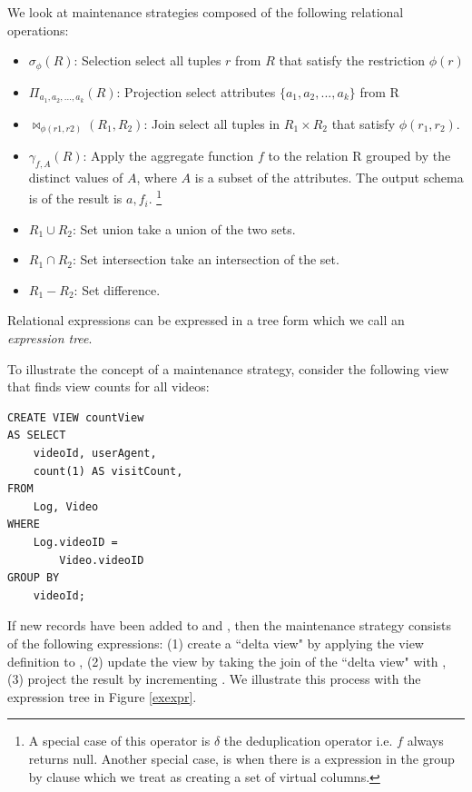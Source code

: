 We look at maintenance strategies composed of the following relational operations:
\begin{itemize}\vspace{-.45em}
\item $\sigma_{\phi}(R)$: Selection select all tuples $r$ from $R$ that satisfy the restriction $\phi (r)$ \vspace{-.45em}
\item $\Pi_{a_1,a_2,...,a_k}(R)$: Projection select attributes $\{a_1,a_2,...,a_k\}$ from R \vspace{-.45em}
\item $\bowtie_{\phi (r1,r2)}(R_1,R_2)$: Join select all tuples in $R_1 \times R_2$ that satisfy $\phi (r_1,r_2)$.
\item $\gamma_{f,A}(R)$: Apply the aggregate function $f$ to the relation R grouped by the distinct values of $A$, where $A$ is a subset of the attributes. The output schema is of the result is $a, f_i$. \footnote{A special case of this operator is $\delta$ the deduplication operator i.e. $f$ always returns null. Another special case, is when there is a expression in the group by clause which we treat as creating a set of virtual columns.}\vspace{-.45em} 
\item $R_1 \cup R_2$: Set union take a union of the two sets.
\item $R_1 \cap R_2$: Set intersection take an intersection of the set.
\item $R_1 - R_2$: Set difference.
\end{itemize}
Relational expressions can be expressed in a tree form which we call an \emph{expression tree}.

To illustrate the concept of a maintenance strategy, consider the following view that finds view counts for all videos:
\begin{lstlisting} 
CREATE VIEW countView
AS SELECT 
	videoId, userAgent,
	count(1) AS visitCount,
FROM 
	Log, Video
WHERE 
	Log.videoID = 
		Video.videoID
GROUP BY 
	videoId;
\end{lstlisting}
If new records have been added to  and , then the maintenance strategy consists of the following expressions: (1) create a ``delta view" by applying the view definition to , (2) update the view by taking the join of the ``delta view" with , (3) project the result by incrementing . We illustrate this process with the expression tree in Figure \ref{exexpr}.

